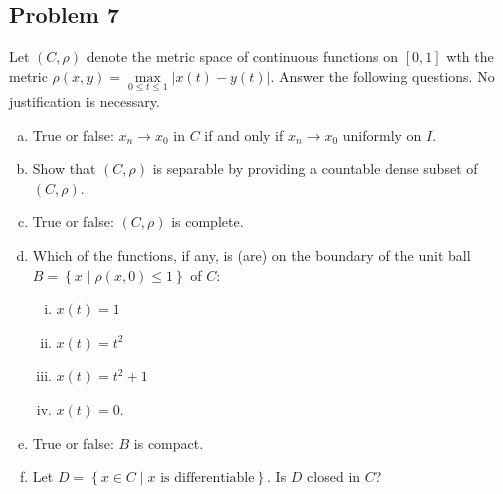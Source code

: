 \documentclass[12pt]{article}
\newcommand\setb[1]{\left \{ #1 \right \}}
\theoremstyle{definition}
\begin{document}
\subsection{Problem 7 \texorpdfstring{\cite{PZ,Lax}}{}}
Let $(C,\rho)$ denote the metric space of continuous functions on $[0,1]$ wth the metric $\rho(x,y) = \max\limits_{0 \leq t \leq 1} |x(t) - y(t)|$. Answer the following questions. No justification is necessary.
\begin{enumerate}[(a)]
    \item True or false: $x_n \to x_0$ in $C$ if and only if $x_n \to x_0$ uniformly on $I$.
    \item Show that $(C,\rho)$ is separable by providing a countable dense subset of $(C,\rho)$.
    \item True or false: $(C,\rho)$ is complete.
    \item Which of the functions, if any, is (are) on the boundary of the unit ball $B = \setb{ x \mid \rho(x,0) \leq 1 }$ of $C$:
    \begin{enumerate}[(i)]
        \item $x(t) = 1$
        \item $x(t) = t^2$
        \item $x(t) = t^2 + 1$
        \item $x(t) = 0$.
    \end{enumerate}
    \item True or false: $B$ is compact.
    \item Let $D = \setb{ x \in C \mid x \text{ is differentiable}}$. Is $D$ closed in $C$?
\end{enumerate}
\end{document}
